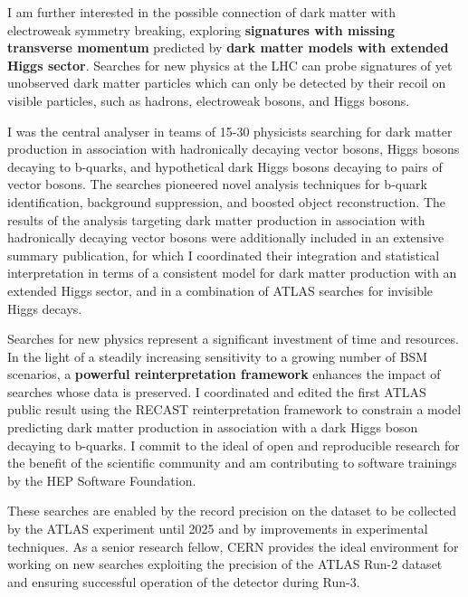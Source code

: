 \documentclass{article}
\begin{document}
\medskip

I am further interested in the possible connection of dark matter with electroweak symmetry breaking, exploring \textbf{signatures with missing transverse momentum} predicted by \textbf{dark matter models with extended Higgs sector}.
Searches for new physics at the LHC can probe signatures of yet unobserved dark matter particles which can only be detected by their recoil on visible particles, such as hadrons, electroweak bosons, and Higgs bosons.

I was the central analyser in teams of 15-30 physicists searching for dark matter production in association with hadronically decaying vector bosons, Higgs bosons decaying to b-quarks, and hypothetical dark Higgs bosons decaying to pairs of vector bosons. The searches pioneered novel analysis techniques for b-quark identification, background suppression, and boosted object reconstruction.
The results of the analysis targeting dark matter production in association with hadronically decaying vector bosons were additionally included in an extensive summary publication, for which I coordinated their integration and statistical interpretation in terms of a consistent model for dark matter production with an extended Higgs sector, and in a combination of ATLAS searches for invisible Higgs decays.
\medskip

Searches for new physics represent a significant investment of time and resources. In the light of a steadily increasing sensitivity to a growing number of BSM scenarios, a \textbf{powerful reinterpretation framework} enhances the impact of searches whose data is preserved. I coordinated and edited the first ATLAS public result using the RECAST reinterpretation framework to constrain a model predicting dark matter production in association with a dark Higgs boson decaying to b-quarks. I commit to the ideal of open and reproducible research for the benefit of the scientific community and am contributing to software trainings by the HEP Software Foundation.
\medskip

These searches are enabled by the record precision on the dataset to be collected by the ATLAS experiment until 2025 and by improvements in experimental techniques. As a senior research fellow, CERN provides the ideal environment for working on new searches exploiting the precision of the ATLAS Run-2 dataset and ensuring successful operation of the detector during Run-3.

\end{document}
